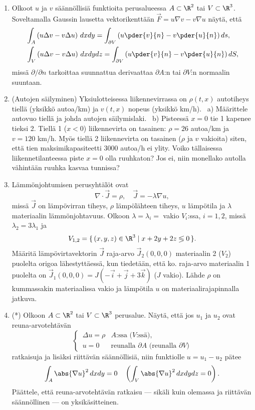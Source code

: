 \begin{enumerate}
\item
Olkoot $u$ ja $v$ säännöllisiä funktioita perusalueessa $A\subset\R^2$ tai $V\subset\R^3$.
Soveltamalla Gaussin lausetta vektorikenttään $\vec F=u\nabla v-v\nabla u$ näytä, että
\begin{align*}
&\int_A \left(u\Delta v-v\Delta u\right)\,dxdy
                 = \int_{\partial V} \left(u\pder{v}{n}-v\pder{u}{n}\right)ds, \\
&\int_V \left(u\Delta v-v\Delta u\right)\,dxdydz 
                 = \int_{\partial V} \left(u\pder{v}{n}-v\pder{u}{n}\right)dS,
\end{align*}
missä $\partial/\partial n$ tarkoittaa suunnattua derivaattaa $\partial A$:n tai $\partial V$:n
normaalin suuntaan.

\item {}
(Autojen säilyminen) Yksiulotteisessa liikennevirrassa on $\rho(t,x)$ autotiheys tiellä
(yksikkö autoa/km) ja $v(t,x)$ nopeus (yksikkö km/h). \ a) Määrittele autovuo tiellä ja johda
autojen säilymislaki. \ b) Pisteessä $x=0$ tie 1 kapenee tieksi 2. Tiellä 1 ($x<0$)
liikennevirta on tasainen: $\rho=26$ autoa/km ja $v=120$ km/h. Myös tiellä 2 liikennevirta on
tasainen ($\rho$ ja $v$ vakioita) siten, että tien maksimikapasiteetti $3000$ autoa/h ei ylity.
Voiko tällaisessa liikennetilanteessa piste $x=0$ olla ruuhkaton? Jos ei, niin monellako
autolla vähintään ruuhka kasvaa tunnissa?

\item 
Lämmönjohtumisen perusyhtälöt ovat
\[
\nabla\cdot\vec J = \rho, \quad \vec J = - \lambda \nabla u,
\]
missä $\vec J$ on lämpövirran tiheys, $\rho$ lämpölähteen tiheys, $u$ lämpötila ja 
$\lambda$ materiaalin lämmönjohtavuus. Olkoon $\lambda = \lambda_i =$ vakio $V_i$:ssa, 
$i = 1,2$, missä $\lambda_2 = 3 \lambda_1$ ja
\[
V_{1, 2} = \{\,(x, y, z) \in \R^3 \mid x+2y+2z \lessgtr 0 \,\}.
\]
Määritä lämpövirtavektorin $\vec J$ raja-arvo $\vec J_2 (0, 0, 0)$ materiaalin 2 ($V_2$) 
puolelta origoa lähestyttäessä, kun tiedetään, että ko. raja-arvo materiaalin 1 puolelta on 
$\vec J_1(0, 0, 0) = J(-\vec i+\vec j+3\vec k)$ ($J$ vakio). Lähde $\rho$ on kummassakin 
materiaalissa vakio ja lämpötila $u$ on materiaalirajapinnalla jatkuva.

\item (*)
Olkoon $A\subset\R^2$ tai $V\subset\R^3$ perusalue. Näytä, että jos $u_1$ ja $u_2$ ovat 
reuna-arvotehtävän
\[
\begin{cases} 
\,\Delta u=\rho &\text{$A$:ssa ($V$:ssä)}, \\ 
\,u=0 &\text{reunalla $\partial A$ (reunalla $\partial V$)}
\end{cases}
\] 
ratkaisuja ja lisäksi riittävän säännöllisiä, niin funktiolle $u=u_1-u_2$ pätee
\[
\int_A \abs{\nabla u}^2\,dxdy=0 \quad \left(\int_V \abs{\nabla u}^2\,dxdydz=0\right).
\]
Päättele, että reuna-arvotehtävän ratkaisu --- sikäli kuin olemassa ja riittävän säännöllinen
--- on yksikäsitteinen.

\end{enumerate}